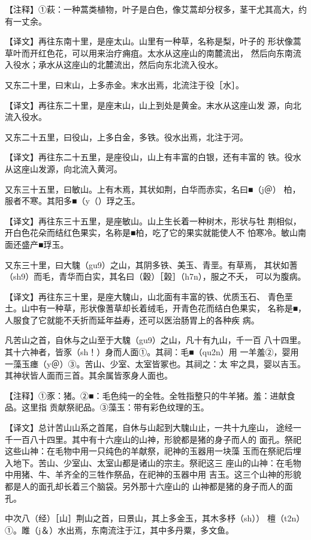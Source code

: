 \documentclass[a4paper,12pt,UTF8,twoside]{ctexbook}
\begin{document}
【注释】①萩：一种蒿类植物，叶子是白色，像艾蒿却分杈多，茎干尤其高大，约有一丈余。

【译文】再往东南十里，是座太山。山里有一种草，名称是梨，叶子的 形状像蒿草叶而开红色花，可以用来治疗痈疽。太水从这座山的南麓流出， 然后向东南流入役水；承水从这座山的北麓流出，然后向东北流入役水。

又东二十里，曰末山，上多赤金。末水出焉，北流注于役［水］。

【译文】再往东二十里，是座末山，山上到处是黄金。末水从这座山发 源，向北流入役水。

又东二十五里，曰役山，上多白金，多铁。役水出焉，北注于河。

【译文】再往东二十五里，是座役山，山上有丰富的白银，还有丰富的 铁。役水从这座山发源，向北流入黄河。

又东三十五里，曰敏山。上有木焉，其状如荆，白华而赤实，名曰■（j＠） 柏，服者不寒。其阳多■（y（）琈之玉。

【译文】再往东三十五里，是座敏山。山上生长着一种树木，形状与牡 荆相似，开白色花朵而结红色果实，名称是■柏，吃了它的果实就能使人不 怕寒冷。敏山南面还盛产■琈玉。

又东三十里，曰大騩（gu9）之山，其阴多铁、美玉、青垩。有草焉， 其状如蓍（sh9）而毛，青华而白实，其名曰（穀）［榖］（h7n），服之不夭， 可以为腹病。

【译文】再往东三十里，是座大騩山，山北面有丰富的铁、优质玉石、 青色垩土。山中有一种草，形状像蓍草却长着绒毛，开青色花而结白色果实， 名称是■，人服食了它就能不夭折而延年益寿，还可以医治肠胃上的各种疾 病。

凡苦山之首，自休与之山至于大騩（gu9）之山，凡十有九山，千一百 八十四里。其十六神者，皆豕（sh！）身而人面①。其祠：毛■（qu2n）用 一羊羞②，婴用一藻玉瘗（y＠）③。苦山、少室、太室皆冢也。其祠之：太 牢之具，婴以吉玉。其神状皆人面而三首。其余属皆豕身人面也。

【注释】①豕：猪。②■：毛色纯一的全牲。全牲指整只的牛羊猪。羞：进献食品。这里指 贡献祭祀品。③藻玉：带有彩色纹理的玉。

【译文】总计苦山山系之首尾，自休与山起到大騩山止，一共十九座山， 途经一千一百八十四里。其中有十六座山的山神，形貌都是猪的身子而人的 面孔。祭祀这些山神：在毛物中用一只纯色的羊献祭，祀神的玉器用一块藻 玉而在祭祀后埋入地下。苦山、少室山、太室山都是诸山的宗主。祭祀这三 座山的山神：在毛物中用猪、牛、羊齐全的三牲作祭品，在祀神的玉器中用 吉玉。这三个山神的形貌都是人的面孔却长着三个脑袋。另外那十六座山的 山神都是猪的身子而人的面孔。

中次八（经）［山］荆山之首，曰景山，其上多金玉，其木多杼（sh）） 檀（t2n）①。雎（j＆）水出焉，东南流注于江，其中多丹粟，多文鱼。
\end{document}
